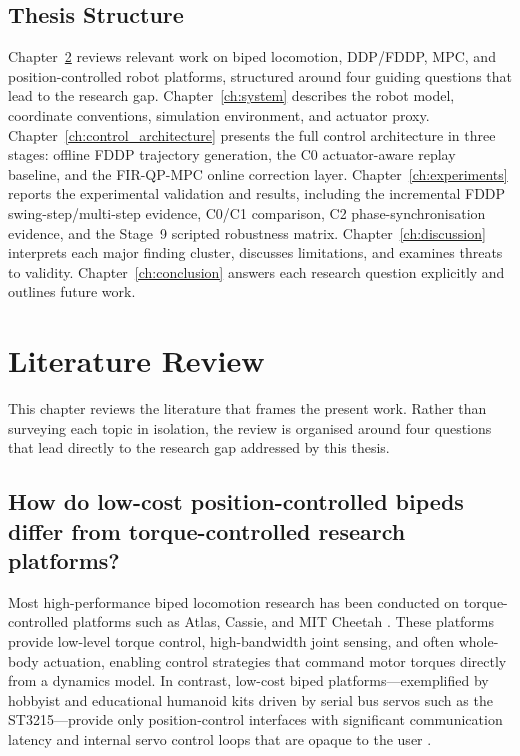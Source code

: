 \documentclass[12pt,a4paper]{report}
\begin{document}
\section{Thesis Structure}
Chapter~\ref{ch:literature} reviews relevant work on biped locomotion, DDP/FDDP, MPC, and position-controlled robot platforms, structured around four guiding questions that lead to the research gap. Chapter~\ref{ch:system} describes the robot model, coordinate conventions, simulation environment, and actuator proxy. Chapter~\ref{ch:control_architecture} presents the full control architecture in three stages: offline FDDP trajectory generation, the C0 actuator-aware replay baseline, and the FIR-QP-MPC online correction layer. Chapter~\ref{ch:experiments} reports the experimental validation and results, including the incremental FDDP swing-step/multi-step evidence, C0/C1 comparison, C2 phase-synchronisation evidence, and the Stage~9 scripted robustness matrix. Chapter~\ref{ch:discussion} interprets each major finding cluster, discusses limitations, and examines threats to validity. Chapter~\ref{ch:conclusion} answers each research question explicitly and outlines future work.
 
\chapter{Literature Review}\label{ch:literature}
 
This chapter reviews the literature that frames the present work. Rather than surveying each topic in isolation, the review is organised around four questions that lead directly to the research gap addressed by this thesis.
 
\section{How do low-cost position-controlled bipeds differ from torque-controlled research platforms?}
 
Most high-performance biped locomotion research has been conducted on torque-controlled platforms such as Atlas, Cassie, and MIT Cheetah \cite{wensing2024_locomotion}. These platforms provide low-level torque control, high-bandwidth joint sensing, and often whole-body actuation, enabling control strategies that command motor torques directly from a dynamics model. In contrast, low-cost biped platforms---exemplified by hobbyist and educational humanoid kits driven by serial bus servos such as the ST3215---provide only position-control interfaces with significant communication latency and internal servo control loops that are opaque to the user \cite{gerry2022_lowcost}.
 
\end{document}
